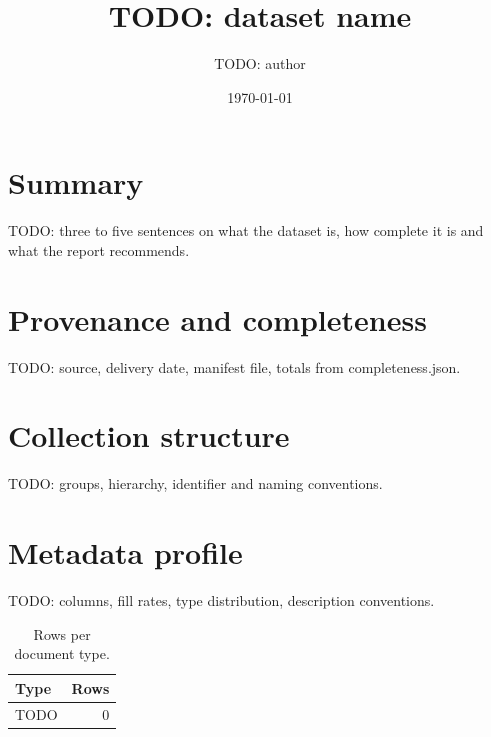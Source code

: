 \documentclass[11pt,a4paper]{article}
\title{TODO: dataset name}
\author{TODO: author}
\date{\today}
\begin{document}
\maketitle

\section*{Summary}
TODO: three to five sentences on what the dataset is, how complete it is and
what the report recommends.

\section{Provenance and completeness}
TODO: source, delivery date, manifest file, totals from completeness.json.


\section{Collection structure}
TODO: groups, hierarchy, identifier and naming conventions.

\section{Metadata profile}
TODO: columns, fill rates, type distribution, description conventions.

\begin{table}[h]
  \centering
  \begin{tabular}{lr}
    \toprule
    Type & Rows \\
    \midrule
    TODO & 0 \\
    \bottomrule
  \end{tabular}
  \caption{Rows per document type.}
\end{table}
\end{document}
